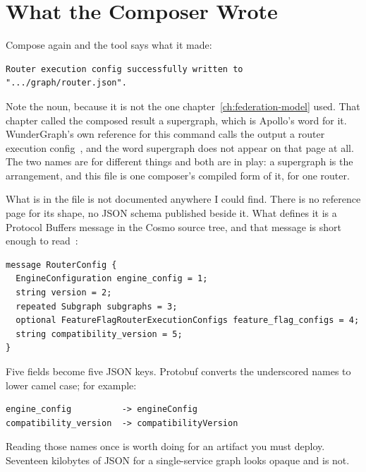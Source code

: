 \section{What the Composer Wrote}
\label{sec:ch07-what-the-composer-wrote}

%
Compose again and the tool says what it made:

\begin{verbatim}
Router execution config successfully written to ".../graph/router.json".
\end{verbatim}

%
Note the noun, because it is not the one
chapter~\ref{ch:federation-model} used. That chapter called the composed
result a supergraph, which is Apollo's word for it. WunderGraph's own reference
for this command calls the output a router execution
config~\autocite{cosmocompose}, and the word supergraph does not appear on
that page at all. The two names are for different things and both are in play:
a supergraph is the arrangement, and this file is one composer's compiled form
of it, for one router.

%
What is in the file is not documented anywhere I could find. There is no
reference page for its shape, no JSON schema published beside it. What defines
it is a Protocol Buffers message in the Cosmo source tree, and that message is
short enough to read~\autocite{cosmonodeproto}:

\begin{verbatim}
message RouterConfig {
  EngineConfiguration engine_config = 1;
  string version = 2;
  repeated Subgraph subgraphs = 3;
  optional FeatureFlagRouterExecutionConfigs feature_flag_configs = 4;
  string compatibility_version = 5;
}
\end{verbatim}

%
Five fields become five JSON keys. Protobuf converts the underscored names
to lower camel case; for example:

\begin{verbatim}
engine_config          -> engineConfig
compatibility_version  -> compatibilityVersion
\end{verbatim}

Reading those names once is worth doing for an artifact you must deploy. Seventeen kilobytes of JSON for a single-service graph looks
opaque and is not.

